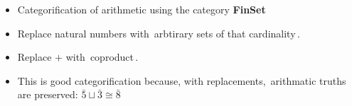\begin{itemize}
    \item Categorification of arithmetic using the category \textbf{FinSet}
    \item Replace natural numbers with \,arbtirary sets of that cardinality\,.
    \item Replace $+$ with \,coproduct\,.
    \item This is good categorification because, with replacements, \,arithmatic truths are preserved: $\bar{5}\sqcup \bar{3} \cong \bar{8}$\,

  \end{itemize}

